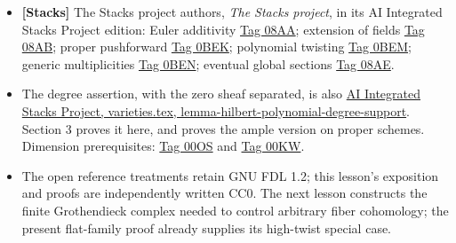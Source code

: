 \documentclass[11pt]{article}
\providecommand{\tightlist}{\setlength{\itemsep}{0pt}\setlength{\parskip}{0pt}}
\begin{document}
\begin{itemize}
\tightlist
\item
  \textbf{{[}Stacks{]}} The Stacks project authors, \emph{The Stacks
  project}, in its AI Integrated Stacks Project edition: Euler
  additivity
  \href{https://kokunoyumeto.github.io/stacks-zh-hans-cn/en/varieties.html\#varieties-lemma-euler-characteristic-additive}{Tag
  08AA}; extension of fields
  \href{https://kokunoyumeto.github.io/stacks-zh-hans-cn/en/varieties.html\#varieties-lemma-euler-characteristic-extend-base-field}{Tag
  08AB}; proper pushforward
  \href{https://kokunoyumeto.github.io/stacks-zh-hans-cn/en/varieties.html\#varieties-lemma-euler-characteristic-morphism}{Tag
  0BEK}; polynomial twisting
  \href{https://kokunoyumeto.github.io/stacks-zh-hans-cn/en/varieties.html\#varieties-lemma-numerical-polynomial-from-euler}{Tag
  0BEM}; generic multiplicities
  \href{https://kokunoyumeto.github.io/stacks-zh-hans-cn/en/varieties.html\#varieties-lemma-numerical-polynomial-leading-term}{Tag
  0BEN}; eventual global sections
  \href{https://kokunoyumeto.github.io/stacks-zh-hans-cn/en/varieties.html\#varieties-lemma-hilbert-polynomial-H0}{Tag
  08AE}.
\item
  The degree assertion, with the zero sheaf separated, is also
  \href{https://kokunoyumeto.github.io/stacks-zh-hans-cn/en/varieties.html\#varieties-lemma-hilbert-polynomial-degree-support}{AI
  Integrated Stacks Project, varieties.tex,
  lemma-hilbert-polynomial-degree-support}. Section 3 proves it here,
  and proves the ample version on proper schemes. Dimension
  prerequisites:
  \href{https://kokunoyumeto.github.io/stacks-zh-hans-cn/en/algebra.html\#algebra-lemma-dimension-spell-it-out}{Tag
  00OS} and
  \href{https://kokunoyumeto.github.io/stacks-zh-hans-cn/en/algebra.html\#algebra-lemma-one-equation}{Tag
  00KW}.
\item
  The open reference treatments retain GNU FDL 1.2; this lesson's
  exposition and proofs are independently written CC0. The next lesson
  constructs the finite Grothendieck complex needed to control arbitrary
  fiber cohomology; the present flat-family proof already supplies its
  high-twist special case.
\end{itemize}
\end{document}
